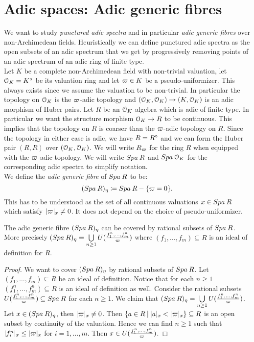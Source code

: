 \section{Adic spaces: Adic generic fibres}\label{adicgenericfibresection}

We want to study \emph{punctured adic spectra} and in particular \emph{adic generic fibres} over non-Archimedean fields. Heuristically we can define punctured adic spectra as the open subsets of an adic spectrum that we get by progressively removing points of an adic spectrum of an adic ring of finite type.\\

Let $K$ be a complete non-Archimedean field with non-trivial valuation, let $\mathcal{O}_K=K{^{\circ}}$ be its valuation ring and let $\varpi\in K$ be a pseudo-uniformizer. This always exists since we assume the valuation to be non-trivial. In particular the topology on $\mathcal{O}_K$ is the $\varpi$-adic topology and $(\mathcal{O}_K, \mathcal{O}_K)\to(K,\mathcal{O}_K)$ is an 
adic morphism of Huber pairs.
Let $R$ be an $\mathcal{O}_K$-algebra which is adic of finite type. In particular we want the structure morphism $\mathcal{O}_K\to R$ to be continuous. 
This implies that the topology on $R$ is coarser than the $\varpi$-adic topology on $R$.
Since the topology in either case is adic, we have $R=R{^{\circ}}$ and we can form the Huber pair $(R,R)$ over $(\mathcal{O}_K,\mathcal{O}_K)$.
We will write $R_{\varpi}$ for the ring $R$ when equipped with the $\varpi$-adic topology. 
We will write ${Spa{\:R}}$ and ${Spa{\:\mathcal{O}_K}}$ for the corresponding adic spectra to simplify notation.\\

We define the \emph{adic generic fibre} of ${Spa{\:R}}$ to be:
\[({Spa{\:R}})_{\eta}\coloneqq {Spa{\:R}}-\{\varpi=0\}.\]
This has to be understood as the set of all continuous valuations $x\in{Spa{\:R}}$ which satisfy $\lvert\varpi\rvert_{x}\neq0$.
It does not depend on the choice of pseudo-uniformizer.



\begin{prop}\label{prop_adic_fibre}
The adic generic fibre $({Spa{\:R}})_{\eta}$ can be covered by rational subsets of ${Spa{\:R}}$. More precisely
$({Spa{\:R}})_{\eta} = \bigcup\limits_{n\geq1}U(\tfrac{f_1^n,\dots,f_m^n}{\varpi})$ where 
$(f_1,\dots,f_m)\subseteq R$ is an ideal of definition for $R$.
\end{prop}
\begin{proof}
We want to cover $({Spa{\:R}})_{\eta}$ by rational subsets of ${Spa{\:R}}$.
Let $(f_1,\dots,f_m)\subseteq R$ be an ideal of definition. Notice that for each $n\geq 1$ $(f_1^n,\dots,f_m^n)\subseteq R$ is an ideal of definition as well. Consider the rational subsets $U(\tfrac{f_1^n,\dots,f_m^n}{\varpi})\subseteq{Spa{\:R}}$  for each $n\geq 1$. 
We claim that   $({Spa{\:R}})_{\eta} = \bigcup\limits_{n\geq1}U(\tfrac{f_1^n,\dots,f_m^n}{\varpi})$.
Let $x\in({Spa{\:R}})_{\eta}$, then $\lvert\varpi\rvert_{x}\neq0$. Then $\{a\in R\:\vert\: \lvert a\rvert_{x}<\lvert\varpi\rvert_{x}\}\subseteq R$ is an open subset by continuity of the valuation.
Hence we can find $n\geq1$ such that $\lvert f_i^n\rvert_{x}\leq\lvert\varpi\rvert_{x}$ for $i=1,\dots,m$. Then $x\in U(\tfrac{f_1^n,\dots,f_m^n}{\varpi})$.
\end{proof}

